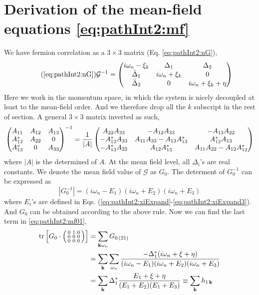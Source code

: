 \section{Derivation of  the mean-field equations \eqref{eq:pathInt2:mf}\label{sec:pathInt2:deriveMF}}
We have fermion correlation as a $3\times3$ matrix (Eq. \ref{eq:pathInt2:nG}), 
\begin{equation}\tag{\ref{eq:pathInt2:nG}}
\mathcal{G}^{-1}=\begin{pmatrix}
i\omega_{n}-\xi_{k}&\Delta_{1}&\Delta_{2}\\
\bar{\Delta}_{1}&i\omega_{n}+\xi_{k}&0\\
\bar{\Delta}_{2}&0&i\omega_{n}+\xi_{k}+\eta
\end{pmatrix}
\end{equation}
Here we work in the momentum space, in which the system is nicely decoupled at least to the mean-field order.  And we therefore drop all the $k$ subscript in the rest of section. A general $3\times3$ matrix inverted as such, 
  \begin{equation}
  \begin{pmatrix}A_{11}&A_{12}&A_{13}\\A_{12}^{*}&A_{22}&0\\A_{13}^{*}&0&A_{33}\end{pmatrix}^{-1}=
  \frac{1}{|A|}
  \begin{pmatrix}A_{22}A_{33}&-A_{12}A_{33}&-A_{13}A_{22}\\
  	-A_{12}^{*}A_{33}&A_{11}A_{33}-A_{13}A_{13}^{*}&A_{12}^{*}A_{13}\\
	-A_{13}^{*}A_{22}&A_{12}A_{13}^{*}&A_{11}A_{22}-A_{12}A_{12}^{*}\end{pmatrix}
  \end{equation}
where $|A|$ is the determined of $A$.   At the mean field level, all $\Delta_{i}$'s are real constants.  We denote the mean field value of $\mathcal{G}$ as $G_{0}$.  The determent of ${G}_{0}^{-1}$ can be expressed as 
\begin{equation}
|G_{0}^{-1}|=(i\omega_{n}-E_{1})(i\omega_{n}+E_{2})(i\omega_{n}+E_{3})
\end{equation}
where $E_{i}$'s are defined in Eqs. (\ref{eq:pathInt2:xiExpand}-\ref{eq:pathInt2:xiExpand3}).
And $G_{0}$ can be obtained according to the above rule. Now we can find the last term in \ref{eq:pathInt2:mf01}, 
\begin{equation}
\begin{split}
\text{tr}\left[{G_{0}}\cdot\left(\begin{smallmatrix}0&1&0\\0&0&0\\0&0&0\end{smallmatrix}\right)\right]&=\sum_{\mathbf{k}\omega_{n}}G_{0\,(21)}\\
&=\sum_{\mathbf{k}}\sum_{\omega_{n}}\frac{-\Delta_{1}^{*}(i\omega_{n}+\xi+\eta)}{(i\omega_{n}-E_{1})(i\omega_{n}+E_{2})(i\omega_{n}+E_{3})}\\
&=\sum_{\mathbf{k}}\Delta_{1}^{*}\frac{E_{1}+\xi+\eta}{(E_{1}+E_{2})(E_{1}+E_{3})}\equiv\sum_{\mathbf{k}}h_{1\,\mathbf{k}}
\end{split}
\end{equation}
